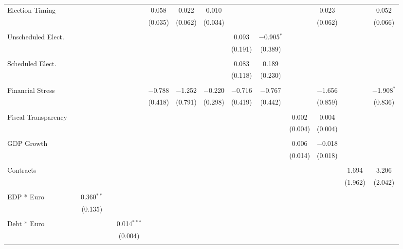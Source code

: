 \begin{table}[!htbp]
\begin{tabular}{@{\extracolsep{5pt}}lccccccccccccc}
 Election Timing &  &  &  &  & 0.058 & 0.022 & 0.010 &  &  &  & 0.023 &  & 0.052 \\ 
  &  &  &  &  & (0.035) & (0.062) & (0.034) &  &  &  & (0.062) &  & (0.066) \\ 
  & & & & & & & & & & & & & \\ 
 Unscheduled Elect. &  &  &  &  &  &  &  & 0.093 & $-$0.905$^{*}$ &  &  &  &  \\ 
  &  &  &  &  &  &  &  & (0.191) & (0.389) &  &  &  &  \\ 
  & & & & & & & & & & & & & \\ 
 Scheduled Elect. &  &  &  &  &  &  &  & 0.083 & 0.189 &  &  &  &  \\ 
  &  &  &  &  &  &  &  & (0.118) & (0.230) &  &  &  &  \\ 
  & & & & & & & & & & & & & \\ 
 Financial Stress &  &  &  &  & $-$0.788 & $-$1.252 & $-$0.220 & $-$0.716 & $-$0.767 &  & $-$1.656 &  & $-$1.908$^{*}$ \\ 
  &  &  &  &  & (0.418) & (0.791) & (0.298) & (0.419) & (0.442) &  & (0.859) &  & (0.836) \\ 
  & & & & & & & & & & & & & \\ 
 Fiscal Transparency &  &  &  &  &  &  &  &  &  & 0.002 & 0.004 &  &  \\ 
  &  &  &  &  &  &  &  &  &  & (0.004) & (0.004) &  &  \\ 
  & & & & & & & & & & & & & \\ 
 GDP Growth &  &  &  &  &  &  &  &  &  & 0.006 & $-$0.018 &  &  \\ 
  &  &  &  &  &  &  &  &  &  & (0.014) & (0.018) &  &  \\ 
  & & & & & & & & & & & & & \\ 
 Contracts &  &  &  &  &  &  &  &  &  &  &  & 1.694 & 3.206 \\ 
  &  &  &  &  &  &  &  &  &  &  &  & (1.962) & (2.042) \\ 
  & & & & & & & & & & & & & \\ 
 EDP * Euro &  & 0.360$^{**}$ &  &  &  &  &  &  &  &  &  &  &  \\ 
  &  & (0.135) &  &  &  &  &  &  &  &  &  &  &  \\ 
  & & & & & & & & & & & & & \\ 
 Debt * Euro &  &  &  & 0.014$^{***}$ &  &  &  &  &  &  &  &  &  \\ 
  &  &  &  & (0.004) &  &  &  &  &  &  &  &  &  \\ 
  & & & & & & & & & & & & & \\ 

\end{tabular}
\end{table}
